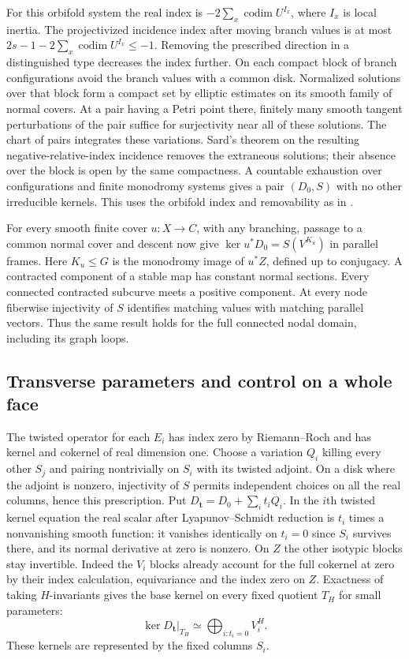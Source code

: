 For this orbifold system the real index is \(-2\sum_x\operatorname{codim}U^{I_x}\), where \(I_x\) is local inertia. The projectivized incidence index after moving branch values is at most \(2s-1-2\sum_x\operatorname{codim}U^{I_x}\le-1\). Removing the prescribed direction in a distinguished type decreases the index further. On each compact block of branch configurations avoid the branch values with a common disk. Normalized solutions over that block form a compact set by elliptic estimates on its smooth family of normal covers. At a pair having a Petri point there, finitely many smooth tangent perturbations of the pair suffice for surjectivity near all of these solutions. The chart of pairs integrates these variations. Sard's theorem on the resulting negative-relative-index incidence removes the extraneous solutions; their absence over the block is open by the same compactness. A countable exhaustion over configurations and finite monodromy systems gives a pair \((D_0,S)\) with no other irreducible kernels. This uses the orbifold index and removability as in \cite[\S2.8]{dwbn}.

For every smooth finite cover \(u:X\to C\), with any branching, passage to a common normal cover and descent now give \(\ker u^*D_0=S(V^{K_u})\) in parallel frames. Here \(K_u\le G\) is the monodromy image of \(u^*Z\), defined up to conjugacy. A contracted component of a stable map has constant normal sections. Every connected contracted subcurve meets a positive component. At every node fiberwise injectivity of \(S\) identifies matching values with matching parallel vectors. Thus the same result holds for the full connected nodal domain, including its graph loops.

\subsection{Transverse parameters and control on a whole face}

The twisted operator for each \(E_i\) has index zero by Riemann--Roch and has kernel and cokernel of real dimension one. Choose a variation \(Q_i\) killing every other \(S_j\) and pairing nontrivially on \(S_i\) with its twisted adjoint. On a disk where the adjoint is nonzero, injectivity of \(S\) permits independent choices on all the real columns, hence this prescription. Put \(D_{\mathbf t}=D_0+\sum_i t_i Q_i\). In the \(i\)th twisted kernel equation the real scalar after Lyapunov--Schmidt reduction is \(t_i\) times a nonvanishing smooth function: it vanishes identically on \(t_i=0\) since \(S_i\) survives there, and its normal derivative at zero is nonzero. On \(Z\) the other isotypic blocks stay invertible. Indeed the \(V_i\) blocks already account for the full cokernel at zero by their index calculation, equivariance and the index zero on \(Z\). Exactness of taking \(H\)-invariants gives the base kernel on every fixed quotient \(T_H\) for small parameters:
\begin{equation}
\ker D_{\mathbf t}|_{T_H}\simeq\bigoplus_{i:t_i=0}V_i^H.                \label{eq:face-kernels}
\end{equation}
These kernels are represented by the fixed columns \(S_i\).

